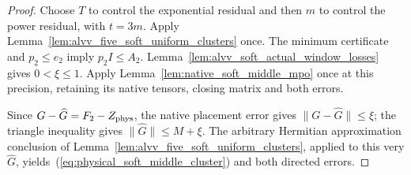 \begin{proof}\leanok
    Choose $T$ to control the exponential residual and then $m$ to
    control the power residual, with $t=3m$. Apply
    Lemma~\ref{lem:alvv_five_soft_uniform_clusters} once. The minimum
    certificate and $p_2\le e_2$ imply $p_2I\le A_2$.
    Lemma~\ref{lem:alvv_soft_actual_window_losses} gives $0<\xi\le1$.
    Apply Lemma~\ref{lem:native_soft_middle_mpo} once at this precision,
    retaining its native tensors, closing matrix and both errors.

    Since $G-\widehat G=F_2-Z_{\rm phys}$, the native placement error gives
    $\|G-\widehat G\|\le\xi$; the triangle inequality gives
    $\|\widehat G\|\le M+\xi$. The arbitrary Hermitian approximation
    conclusion of Lemma~\ref{lem:alvv_five_soft_uniform_clusters}, applied
    to this very $\widehat G$, yields~(\ref{eq:physical_soft_middle_cluster})
    and both directed errors.
\end{proof}
